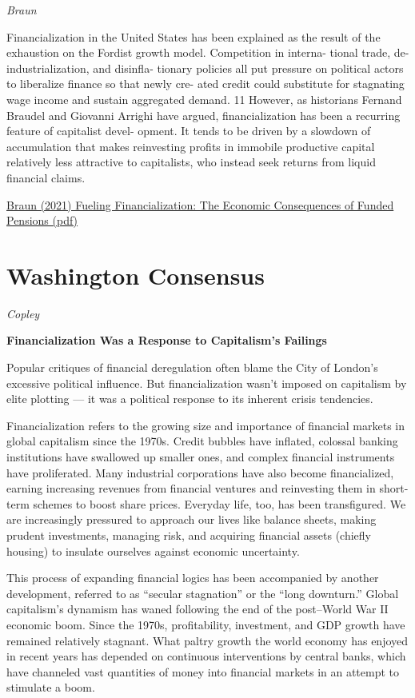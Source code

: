 \documentclass[
]{book}
\begin{document}
\emph{Braun}

Financialization in the United States has been
explained as the result of the exhaustion on the
Fordist growth model. Competition in interna-
tional trade, de-industrialization, and disinfla-
tionary policies all put pressure on political
actors to liberalize finance so that newly cre-
ated credit could substitute for stagnating wage
income and sustain aggregated demand. 11
However, as historians Fernand Braudel and
Giovanni Arrighi have argued, financialization
has been a recurring feature of capitalist devel-
opment. It tends to be driven by a slowdown of
accumulation that makes reinvesting profits in
immobile productive capital relatively less
attractive to capitalists, who instead seek
returns from liquid financial claims.

\href{pdf/Braun_2021_Fueling_Financialization_Funded_Pensions.pdf}{Braun (2021) Fueling Financialization: The Economic Consequences of Funded Pensions (pdf)}

\hypertarget{washington-consensus}{%
\section{Washington Consensus}\label{washington-consensus}}

\emph{Copley}

\textbf{Financialization Was a Response to Capitalism's Failings}

Popular critiques of financial deregulation often blame the City of London's excessive political influence. But financialization wasn't imposed on capitalism by elite plotting --- it was a political response to its inherent crisis tendencies.

Financialization refers to the growing size and importance of financial markets in global capitalism since the 1970s. Credit bubbles have inflated, colossal banking institutions have swallowed up smaller ones, and complex financial instruments have proliferated. Many industrial corporations have also become financialized, earning increasing revenues from financial ventures and reinvesting them in short-term schemes to boost share prices. Everyday life, too, has been transfigured. We are increasingly pressured to approach our lives like balance sheets, making prudent investments, managing risk, and acquiring financial assets (chiefly housing) to insulate ourselves against economic uncertainty.

This process of expanding financial logics has been accompanied by another development, referred to as ``secular stagnation'' or the ``long downturn.'' Global capitalism's dynamism has waned following the end of the post--World War II economic boom. Since the 1970s, profitability, investment, and GDP growth have remained relatively stagnant. What paltry growth the world economy has enjoyed in recent years has depended on continuous interventions by central banks, which have channeled vast quantities of money into financial markets in an attempt to stimulate a boom.
\end{document}
